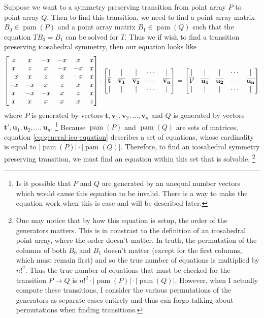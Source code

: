 \documentclass[a4paper,10pt]{article}
\let\oldfootnote\footnote
\renewcommand{\footnote}{\unskip\oldfootnote}
\theoremstyle{plain}
\theoremstyle{definition}
\theoremstyle{remark}
\renewcommand{\vec}[1]{\mathbf{#1}}
\newcommand\abs[1]{\left|#1\right|}
\DeclareMathOperator{\pam}{pam}
\begin{document}
Suppose we want to a symmetry preserving transition from point array \( P \) to point array \( Q \).
Then to find this transition, we need to find a point array matrix \( B_0 \in \pam(P) \) and a point array matrix \( B_1 \in \pam(Q) \) such that the equation \( TB_0 = B_1 \) can be solved for \( T \).
Thus we if wish to find a transition preserving icosahedral symmetry, then our equation looks like
\begin{equation}
	\begin{bmatrix}
		z  & x  & -x & -x & x  & x \\
		x  & z  & x  & -x & -x & x \\
		-x & x  & z  & x  & -x & x \\
		-x & -x & x  & z  & x  & x \\
		x  & -x & -x & x  & z  & x \\
		x  & x  & x  & x  & x  & z
	\end{bmatrix}
	\cdot
	\begin{bmatrix}
		| & | & | & \cdots & | \\
		\icobar{t} & \icobar{v_1} & \icobar{v_2} & \cdots & \icobar{v_n} \\
		| & | & | & \cdots & |
	\end{bmatrix}
	=
	\begin{bmatrix}
		| & | & | & \cdots & | \\
		\icobar{t'} & \icobar{u_1} & \icobar{u_2} & \cdots & \icobar{u_n} \\
		| & | & | & \cdots & |
	\end{bmatrix}
	\label{eq:general-ico-equation}
\end{equation}
where \( P \) is generated by vectors \(\vec{t}, \vec{v}_1, \vec{v}_2, \dots, \vec{v}_n\) and \( Q \) is generated by vectors \(\vec{t'}, \vec{u}_1, \vec{u}_2, \dots, \vec{u}_n\).
\footnote{
	Is it possible that \( P \) and \( Q \) are generated by an unequal number vectors which would cause this equation to be invalid. 
	There is a way to make the equation work when this is case and will be described later.
}
Because \( \pam(P) \) and \( \pam(Q) \) are sets of matrices, equation \ref{eq:general-ico-equation} describes a set of equations, whose cardinality is equal to \( \abs{\pam(P)}\cdot\abs{\pam(Q)}\).
Therefore, to find an icosahedral symmetry preserving transition, we must find an equation within this set that is solvable.
\footnote{
	One may notice that by how this equation is setup, the order of the generators matters.
	This is in constrast to the definition of an icosahedral point array, where the order doesn't matter.
	In truth, the permutation of the columns of both \( B_0 \) and \( B_1 \) doesn't matter (except for the first columns, which must remain first) and so the true number of equations is multiplied by \( n!^2 \).
	Thus the true number of equations that must be checked for the transition \( P \to Q \) is \( n!^2\cdot\abs{\pam(P)}\cdot\abs{\pam(Q)} \).
	However, when I actually compute these transitions, I consider the various permutations of the generators as separate cases entirely and thus can forgo talking about permutations when finding transitions.
}
\end{document}
